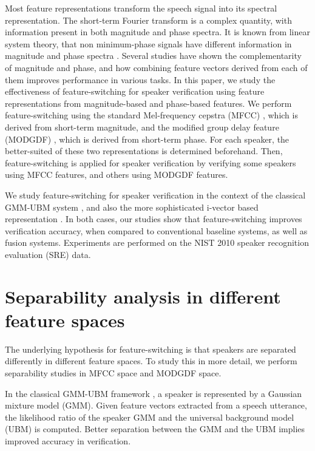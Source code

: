 \documentclass{article}
\begin{document}
Most feature representations transform the speech signal into its spectral
representation. The short-term Fourier transform is a complex quantity, with
information present in both magnitude and phase spectra. It is known from linear
system theory, that non minimum-phase signals have different information in
magnitude and phase spectra \cite{oppenheim}. Several studies \cite{mgd_complement}
have shown the complementarity of magnitude and phase, and how combining feature
vectors derived from each of them improves performance in various tasks. In this
paper, we study the effectiveness of feature-switching for speaker verification
using feature representations from magnitude-based and phase-based features. We
perform feature-switching using the standard Mel-frequency cepstra (MFCC)
\cite{mfcc}, which is derived from short-term magnitude, and the modified group delay feature
(MODGDF) \cite{hegdeModgdf}, which is derived from short-term phase. For each speaker, the
better-suited of these two representations is determined beforehand. Then,
feature-switching is applied for speaker verification by verifying some speakers
using MFCC features, and others using MODGDF features.

We study feature-switching for speaker verification in the context of the
classical GMM-UBM system \cite{reynoldsAdaptedGMM}, and also the more
sophisticated i-vector based representation \cite{dehak_ivector}. In both cases,
our studies show that feature-switching improves verification accuracy, when compared to
conventional baseline systems, as well as fusion systems. Experiments are performed on the
NIST 2010 speaker recognition evaluation (SRE) \cite{nist2010SRE} data.


\section{Separability analysis in different feature spaces}
\label{sec:separability}
The underlying hypothesis for feature-switching is that speakers are separated
differently in different feature spaces. To study this in more detail, we
perform separability studies in MFCC space and MODGDF space.

In the classical GMM-UBM framework \cite{reynoldsAdaptedGMM}, a speaker is
represented by a Gaussian mixture model (GMM). Given feature vectors extracted
from a speech utterance, the likelihood ratio of the speaker GMM and the
universal background model (UBM) is computed. Better separation between the GMM
and the UBM implies improved accuracy in verification.
\end{document}
